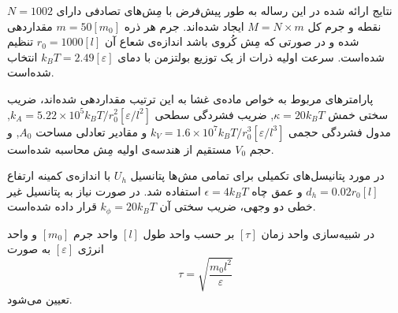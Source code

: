 نتایج ارائه شده در این رساله  به طور پیش‌فرض با مِش‌های تصادفی دارای 
$N=1002$
نقطه و جرم کل
$M=N\times m$
ایجاد شده‌اند. جرم هر ذره 
$m=50 [m_0]$
مقداردهی شده و در صورتی که مِش کُروی باشد اندازه‌ی شعاع آن 
$r_0=1000 [l]$
تنظیم شده‌است. سرعت اولیه ذرات از یک توزیع بولتزمن با دمای 
$k_BT=2.49 [\varepsilon]$
انتخاب شده‌است.

پارامترهای مربوط به خواص ماده‌ی غشا به این ترتیب مقداردهی شده‌اند، ضریب سختی خمش 
$\kappa=20k_BT$,
ضریب فشردگی سطحی
$k_A=5.22\times10^{5}k_BT/r_0^2 [\varepsilon/l^2]$,
مدول فشردگی حجمی
$k_V=1.6\times10^7k_BT/r_0^3 [\varepsilon/l^3]$
و مقادیر تعادلی مساحت
$A_0$,
و حجم
$V_0$
مستقیم از هندسه‌ی اولیه مِش محاسبه‌ شده‌است. 

در مورد پتانیسل‌های تکمیلی برای تمامی مش‌ها پتانسیل 
$U_h$
با اندازه‌ی کمینه ارتفاع 
$d_h=0.02r_0 [l]$
و عمق چاه
$\epsilon=4k_BT$
استفاده شد. در صورت نیاز به پتانسیل غیر خطی دو وجهی، ضریب سختی آن 
$k_{\phi}=20k_BT$
قرار داده شده‌است.

در شبیه‌سازی واحد زمان
$[\tau]$
بر حسب واحد طول 
$[l]$
واحد جرم
$[m_0]$
و واحد انرژی
$[\varepsilon]$
به صورت
\begin{equation}
\tau =\sqrt{\frac{m_0l^2}{\varepsilon}}
\end{equation}
تعیین می‌شود.









